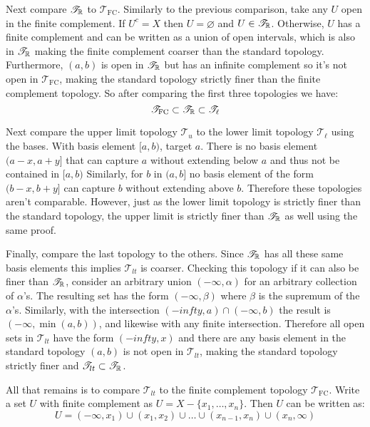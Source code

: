 \documentclass{article}
\begin{document}
  Next compare $\mathscr{T}_{\mathbb{R}}$ to $\mathscr{T}_{\text{FC}}$. Similarly to the previous comparison, take any $U$ open in the finite complement. If $U^c = X$ then $U = \varnothing$ and $U \in \mathscr{T}_{\mathbb{R}}$. Otherwise, $U$ has a finite complement and can be written as a union of open intervals, which is also in $\mathscr{T}_{\mathbb{R}}$ making the finite complement coarser than the standard topology. Furthermore, $(a, b)$ is open in $\mathscr{T}_{\mathbb{R}}$ but has an infinite complement so it's not open in $\mathscr{T}_{\text{FC}}$, making the standard topology strictly finer than the finite complement topology. So after comparing the first three topologies we have:
$$\mathscr{T}_{\text{FC}} \subset \mathscr{T}_{\mathbb{R}}  \subset \mathscr{T}_\ell$$

  Next compare the upper limit topology $\mathscr{T}_u$ to the lower limit topology $\mathscr{T}_\ell$ using the bases. With basis element $[a, b)$, target $a$. There is no basis element $(a-x, a+y]$ that can capture $a$ without extending below $a$ and thus not be contained in $[a, b)$ Similarly, for $b$ in $(a, b]$ no basis element of the form $(b-x, b+y]$ can capture $b$ without extending above $b$. Therefore these topologies aren't comparable. However, just as the lower limit topology is strictly finer than the standard topology, the upper limit is strictly finer than $\mathscr{T}_{\mathbb{R}}$ as well using the same proof.

  Finally, compare the last topology to the others. Since $\mathscr{T}_{\mathbb{R}}$ has all these same basis elements this implies $\mathscr{T}_{lt}$ is coarser. Checking this topology if it can also be finer than $\mathscr{T}_{\mathbb{R}}$, consider an arbitrary union $(-\infty, \alpha)$ for an arbitrary collection of $\alpha$'s. The resulting set has the form $(-\infty, \beta)$ where $\beta$ is the supremum of the $\alpha$'s. Similarly, with the intersection $(-infty, a) \cap (-\infty, b)$ the result is $(-\infty, \min(a, b))$, and likewise with any finite intersection. Therefore all open sets in $\mathscr{T}_{lt}$ have the form $(-infty, x)$ and there are any basis element in the standard topology $(a, b)$ is not open in $\mathscr{T}_{lt}$, making the standard topology strictly finer and $\mathscr{T}_{lt} \subset \mathscr{T}_{\mathbb{R}}$.

  All that remains is to compare $\mathscr{T}_{lt}$ to the finite complement topology $\mathscr{T}_{\text{FC}}$. Write a set $U$ with finite complement as $U = X - \{x_1, \ldots, x_n\}$. Then $U$ can be written as:
$$U = (-\infty, x_1) \cup (x_1, x_2) \cup \ldots \cup (x_{n-1}, x_n) \cup (x_n, \infty)$$
\end{document}
